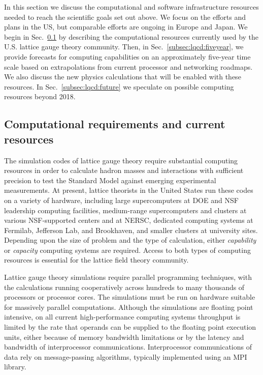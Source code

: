 In this section we discuss the computational and software infrastructure resources needed to reach the scientific goals set out above.
We focus on the efforts and plans in the US, but comparable efforts are ongoing in Europe and Japan.  We begin in Sec.~\ref{subsec:lqcd:current} by describing the computational resources currently used by the U.S. lattice gauge theory community.  Then, in Sec.~\ref{subsec:lqcd:fiveyear}, we provide forecasts for computing capabilities on an approximately five-year time scale based on extrapolations from current processor and networking roadmaps.  We also discuss the new physics calculations that will be enabled with these resources.  In Sec.~\ref{subsec:lqcd:future} we speculate on possible computing resources beyond 2018.

\subsection{Computational requirements and current resources}
\label{subsec:lqcd:current}

The simulation codes of lattice gauge theory require substantial computing
resources in order to calculate hadron masses and interactions with sufficient
precision to test the Standard Model against emerging experimental
measurements.  At present, lattice theorists in the United States run these
codes on a variety of hardware, including large supercomputers at DOE and NSF
leadership computing facilities, medium-range supercomputers and clusters at
various NSF-supported centers and at NERSC, dedicated computing systems at
Fermilab, Jefferson Lab, and Brookhaven, and smaller clusters at university
sites.  Depending upon the size of problem and the type of calculation, either
{\em capability} or {\em capacity} computing systems are required.  Access to
both types of computing resources is essential for the lattice field theory
community.

Lattice gauge theory simulations require parallel programming techniques, with
the calculations running cooperatively across hundreds to many thousands of
processors or processor cores.  The simulations must be run on hardware suitable
for massively parallel computations.   Although the simulations are
floating point intensive, on all current high-performance computing systems
throughput is limited by the rate that operands can be supplied to the
floating point execution units, either because of memory bandwidth limitations
or by the latency and bandwidth of interprocessor communications.
Interprocessor communications of data rely on message-passing
algorithms, typically implemented using an MPI~\cite{MPI} library.

